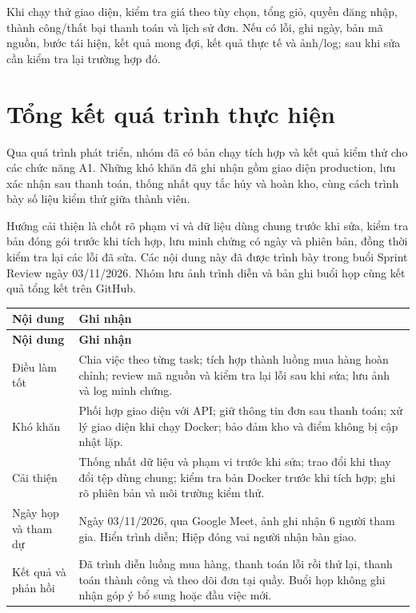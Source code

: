 \documentclass[12pt,a4paper]{report}
\begin{document}
Khi chạy thử giao diện, kiểm tra giá theo tùy chọn, tổng giỏ, quyền đăng nhập, thành công/thất bại thanh toán và lịch sử đơn. Nếu có lỗi, ghi ngày, bản mã nguồn, bước tái hiện, kết quả mong đợi, kết quả thực tế và ảnh/log; sau khi sửa cần kiểm tra lại trường hợp đó.


\section{Tổng kết quá trình thực hiện}

Qua quá trình phát triển, nhóm đã có bản chạy tích hợp và kết quả kiểm thử cho các chức năng A1. Những khó khăn đã ghi nhận gồm giao diện production, lưu xác nhận sau thanh toán, thống nhất quy tắc hủy và hoàn kho, cùng cách trình bày số liệu kiểm thử giữa thành viên.


Hướng cải thiện là chốt rõ phạm vi và dữ liệu dùng chung trước khi sửa, kiểm tra bản đóng gói trước khi tích hợp, lưu minh chứng có ngày và phiên bản, đồng thời kiểm tra lại các lỗi đã sửa. Các nội dung này đã được trình bày trong buổi Sprint Review ngày 03/11/2026. Nhóm lưu ảnh trình diễn và bản ghi buổi họp cùng kết quả tổng kết trên GitHub.


\begingroup
\small
\setlength{\tabcolsep}{5pt}
\renewcommand{\arraystretch}{1.2}
\begin{longtable}{|>{\raggedright\arraybackslash}p{}|>{\raggedright\arraybackslash}p{}|}
\hline
\textbf{Nội dung} & \textbf{Ghi nhận} \\ \hline
\endfirsthead
\hline
\textbf{Nội dung} & \textbf{Ghi nhận} \\ \hline
\endhead
\endfoot
\endlastfoot
Điều làm tốt & Chia việc theo từng task; tích hợp thành luồng mua hàng hoàn chỉnh; review mã nguồn và kiểm tra lại lỗi sau khi sửa; lưu ảnh và log minh chứng. \\ \hline
Khó khăn & Phối hợp giao diện với API; giữ thông tin đơn sau thanh toán; xử lý giao diện khi chạy Docker; bảo đảm kho và điểm không bị cập nhật lặp. \\ \hline
Cải thiện & Thống nhất dữ liệu và phạm vi trước khi sửa; trao đổi khi thay đổi tệp dùng chung; kiểm tra bản Docker trước khi tích hợp; ghi rõ phiên bản và môi trường kiểm thử. \\ \hline
Ngày họp và tham dự & Ngày 03/11/2026, qua Google Meet, ảnh ghi nhận 6 người tham gia. Hiển trình diễn; Hiệp đóng vai người nhận bàn giao. \\ \hline
Kết quả và phản hồi & Đã trình diễn luồng mua hàng, thanh toán lỗi rồi thử lại, thanh toán thành công và theo dõi đơn tại quầy. Buổi họp không ghi nhận góp ý bổ sung hoặc đầu việc mới. \\ \hline
\end{longtable}
\endgroup
\end{document}
